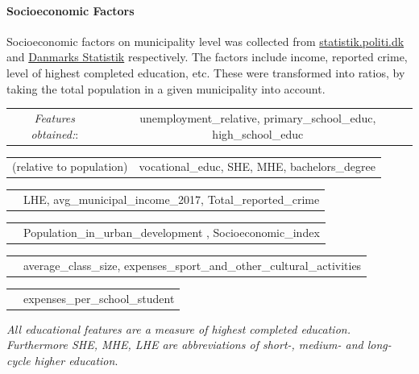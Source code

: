 \documentclass[12pt,a4paper]{article}
\begin{document}
\paragraph{Socioeconomic Factors\newline}
Socioeconomic factors on municipality level was collected from \href{https://statistik.politi.dk/QvAJAXZfc/opendoc.htm?document=QlikApplication%2F2999_Public\%2FPublic_IndsatsResultater.qvw}{statistik.politi.dk} and  
\href{https://www.dst.dk/da/Statistik/emner/befolkning-og-valg}{Danmarks Statistik} respectively. The factors include income, reported crime, level of highest completed education, etc. These were transformed into ratios, by taking the total population in a given municipality into account.   
 \vspace*{5px} \newline
\begin{tabular}{c c}
\textit{Features obtained:}: & unemployment\_relative, primary\_school\_educ, high\_school\_educ \\	
\end{tabular}\newline 
\begin{tabular}{c c}
\small (relative to population) & vocational\_educ,	 SHE, 	MHE, bachelors\_degree  \\	
\end{tabular}\newline 
\begin{tabular}{c c}
\qquad \qquad \qquad \qquad \quad & LHE, avg\_municipal\_income\_2017, Total\_reported\_crime\\	
\end{tabular}\newline 
\begin{tabular}{c c}
\qquad \qquad \qquad \qquad \quad & Population\_in\_urban\_development  , Socioeconomic\_index \\	
\end{tabular}\newline 
\begin{tabular}{c c}
\qquad \qquad \qquad \qquad \quad & average\_class\_size,	expenses\_sport\_and\_other\_cultural\_activities	  \\	
\end{tabular}\newline 
\begin{tabular}{c c}
\qquad \qquad \qquad \qquad \quad & expenses\_per\_school\_student	   \\	
\end{tabular}\newline 
\footnotesize{\textit{All educational features are a measure of highest completed education. Furthermore SHE, MHE, LHE are abbreviations of short-, medium- and long-cycle higher education}}. 
\normalsize
\end{document}

